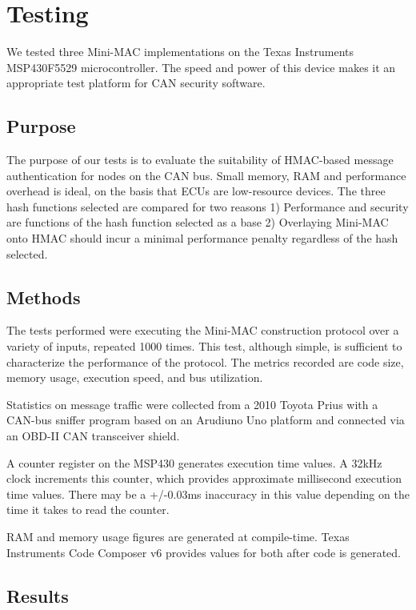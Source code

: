 \section{Testing}
We tested three Mini-MAC implementations on the Texas Instruments MSP430F5529 microcontroller. The speed and power of this device makes it an appropriate test platform for CAN security software.

\subsection{Purpose}

The purpose of our tests is to evaluate the suitability of HMAC-based message authentication for nodes on the CAN bus. Small memory, RAM and performance overhead is ideal, on the basis that ECUs are low-resource devices. The three hash functions selected are compared for two reasons 1) Performance and security are functions of the hash function selected as a base 2) Overlaying Mini-MAC onto HMAC should incur a minimal performance penalty regardless of the hash selected.

\subsection{Methods}

The tests performed were executing the Mini-MAC construction protocol over a variety of inputs, repeated 1000 times. This test, although simple, is sufficient to characterize the performance of the protocol. The metrics recorded are code size, memory usage, execution speed, and bus utilization.

Statistics on message traffic were collected from a 2010 Toyota Prius with a CAN-bus sniffer program  based on an Arudiuno Uno platform and connected via an OBD-II CAN transceiver shield.

A counter register on the MSP430 generates execution time values. A 32kHz clock increments this counter, which provides approximate millisecond execution time values. There may be a +/-0.03ms inaccuracy in this value depending on the time it takes to read the counter.

RAM and memory usage figures are generated at compile-time. Texas Instruments Code Composer v6 provides values for both after code is generated.

\subsection{Results}

